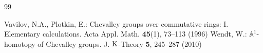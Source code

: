 \documentclass[11pt]{amsart}
\theoremstyle{definition}
\numberwithin{equation}{section}
\numberwithin{equation}{section}
\newcommand{\<}{\langle}
\renewcommand{\>}{\rangle}
\newcommand{\K}{{\operatorname{\rm K}}}
\begin{document}
\begin{thebibliography}{99}

Vavilov, N.A., Plotkin, E.: Chevalley groups over commutative rings: I. Elementary calculations. Acta Appl. Math. {\bf 45}(1), 73--113 (1996)
Wendt, W.: $\mathbb{A}^{1}$-homotopy of Chevalley groups. J. $\K$-Theory {\bf 5}, 245--287 (2010)
\end{thebibliography}
\end{document}
